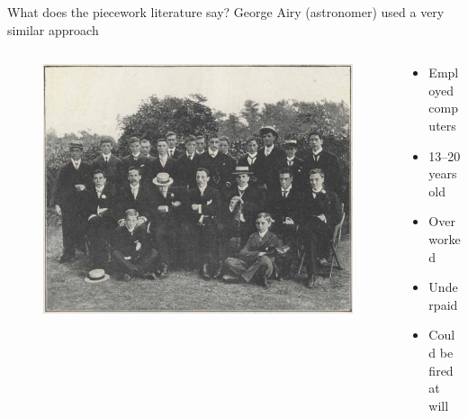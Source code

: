 \documentclass[presentation]{subfiles}
\begin{document}
\begin{frame}{What does the piecework literature say?}
      George Airy (astronomer) used a very similar approach~\cite{grier2013computers}

    \begin{columns}
    \begin{column}{0.6\textwidth}
      \begin{figure}
        \includegraphics[width=\textwidth]{figures/photo/Greenwich-Observatory-computing-staff-1902.jpg}
      \end{figure}
    \end{column}
    
    \begin{column}{0.4\textwidth}
      \begin{itemize}
        \item Employed computers
        \item 13--20 years old
        \item Overworked
        \item Underpaid
        \item Could be fired at will
      \end{itemize}
    \end{column}
    \end{columns}

\end{frame}
\end{document}
